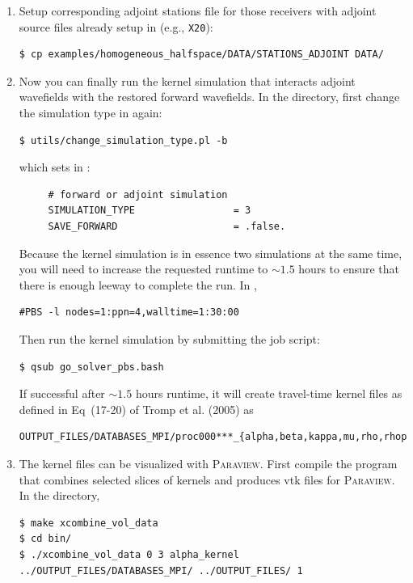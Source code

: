 \documentclass[10pt,fleqn,letterpaper]{article}
\newcommand{\paraview}{\textsc{Paraview}}
\begin{document}
\begin{enumerate}
\item Setup corresponding adjoint stations file  for those receivers with adjoint source files already setup in  (e.g., \texttt{X20}):

\begin{lstlisting}
$ cp examples/homogeneous_halfspace/DATA/STATIONS_ADJOINT DATA/
\end{lstlisting}

\item Now you can finally run the kernel simulation that interacts adjoint wavefields with the restored forward wavefields. In the  directory, first change the simulation type in  again:
%
\begin{lstlisting}
$ utils/change_simulation_type.pl -b
\end{lstlisting}
%
which sets in :
%
\begin{lstlisting}
     # forward or adjoint simulation
     SIMULATION_TYPE                 = 3
     SAVE_FORWARD                    = .false.
\end{lstlisting}

Because the kernel simulation is in essence two simulations at the same time,
you will need to increase the requested runtime to $\sim 1.5$ hours to ensure
that there is enough leeway to complete the run. In ,
%
\begin{lstlisting}
#PBS -l nodes=1:ppn=4,walltime=1:30:00
\end{lstlisting}

Then run the kernel simulation by submitting the job script:
\begin{lstlisting}
$ qsub go_solver_pbs.bash
\end{lstlisting}

If successful after $\sim 1.5$ hours runtime, it will create travel-time kernel files as defined in Eq~(17-20) of Tromp et al. (2005) as 
\begin{lstlisting}
OUTPUT_FILES/DATABASES_MPI/proc000***_{alpha,beta,kappa,mu,rho,rhop}_kernel.bin
\end{lstlisting}

\item The kernel files can be visualized with \paraview. First compile the program that combines selected slices of kernels and produces vtk files for \paraview. In the  directory,

\begin{lstlisting}
$ make xcombine_vol_data
$ cd bin/ 
$ ./xcombine_vol_data 0 3 alpha_kernel ../OUTPUT_FILES/DATABASES_MPI/ ../OUTPUT_FILES/ 1
\end{lstlisting}


\end{enumerate}
\end{document}
